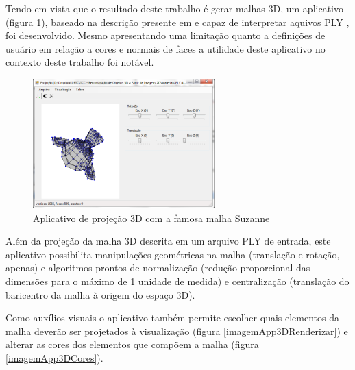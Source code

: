 		Tendo em vista que o resultado deste trabalho é gerar malhas 3D, um aplicativo (figura \ref{imagemApp3D}), baseado na descrição presente em \cite{compGraphsPrincPrat3ed} e capaz de interpretar aquivos PLY \cite{ply}, foi desenvolvido. Mesmo apresentando uma limitação quanto a definições de usuário em relação a cores e normais de faces a utilidade deste aplicativo no contexto deste trabalho foi notável.
		
		\begin{figure}[!htb]
			\centering
			\includegraphics[height=5cm]{imagens/printApp3D.png}
			\caption{Aplicativo de projeção 3D com a famosa malha Suzanne}
			\label{imagemApp3D}
		\end{figure}
		
		Além da projeção da malha 3D descrita em um arquivo PLY de entrada, este aplicativo possibilita manipulações geométricas na malha (translação e rotação, apenas) e algoritmos prontos de normalização (redução proporcional das dimensões para o máximo de 1 unidade de medida) e centralização (translação do baricentro da malha à origem do espaço 3D).
		
		Como auxílios visuais o aplicativo também permite escolher quais elementos da malha deverão ser projetados à visualização (figura \ref{imagemApp3DRenderizar}) e alterar as cores dos elementos que compõem a malha (figura \ref{imagemApp3DCores}).
		

